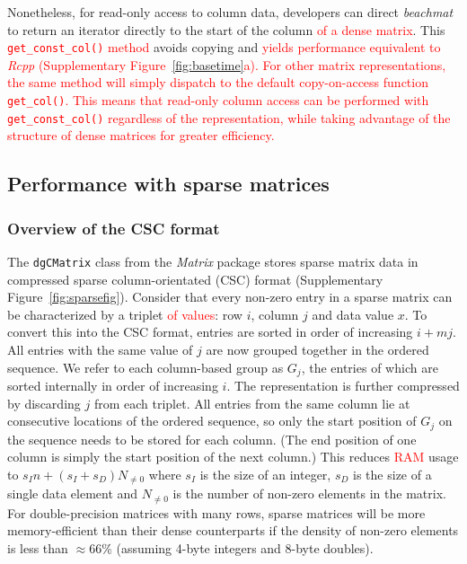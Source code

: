 \documentclass{article}
\newcommand{\beachmat}{\textit{beachmat}}
\newcommand{\code}[1]{\texttt{#1}}
\newcommand{\revised}[1]{\textcolor{red}{#1}}
\begin{document}
Nonetheless, for read-only access to column data, developers can direct \beachmat{} to return an iterator directly to the start of the column \revised{of a dense matrix}.
This \revised{\code{get\_const\_col()} method} avoids copying and \revised{yields performance equivalent to \textit{Rcpp} (Supplementary Figure~\ref{fig:basetime}a).
For other matrix representations, the same method will simply dispatch to the default copy-on-access function \code{get\_col()}.
This means that read-only column access can be performed with \code{get\_const\_col()} regardless of the representation, while taking advantage of the structure of dense matrices for greater efficiency.}

\subsection{Performance with sparse matrices}

\subsubsection{Overview of the CSC format}
The \code{dgCMatrix} class from the \textit{Matrix} package stores sparse matrix data in compressed sparse column-orientated (CSC) format (Supplementary Figure~\ref{fig:sparsefig}).
Consider that every non-zero entry in a sparse matrix can be characterized by a triplet \revised{of values}: row $i$, column $j$ and data value $x$.
To convert this into the CSC format, entries are sorted in order of increasing $i + mj$.
All entries with the same value of $j$ are now grouped together in the ordered sequence.
We refer to each column-based group as $G_j$, the entries of which are sorted internally in order of increasing $i$.
The representation is further compressed by discarding $j$ from each triplet.
All entries from the same column lie at consecutive locations of the ordered sequence, so only the start position of $G_j$ on the sequence needs to be stored for each column.
(The end position of one column is simply the start position of the next column.)
This reduces \revised{RAM} usage to $s_In + (s_I + s_D) N_{\ne 0}$ where $s_I$ is the size of an integer, $s_D$ is the size of a single data element and $N_{\ne 0}$ is the number of non-zero elements in the matrix.
For double-precision matrices with many rows, sparse matrices will be more memory-efficient than their dense counterparts if the density of non-zero elements is less than $\approx66$\% (assuming 4-byte integers and 8-byte doubles). 
\end{document}

